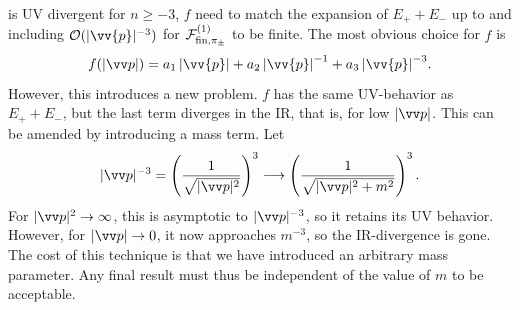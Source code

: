 %
is UV divergent for $n \geq -3$, $f$ need to match the expansion of $E_+ + E_-$ up to and including $\Oh(|\vv{p}|^{-3})$ for $\mathcal{F}^{(1)}_{\mathrm{fin}, \pi_\pm }$ to be finite.
The most obvious choice for $f$ is
%
\begin{equation}
    f(|\vv p|) 
    = a_1  \abs{\vv{p}} + a_2 \, {\abs{\vv{p}}}^{-1} + a_3 \, {\abs{\vv{p}}}^{-3}.
\end{equation}
%
However, this introduces a new problem.
$f$ has the same UV-behavior as $E_+ + E_-$, but the last term diverges in the IR, that is, for low $|\vv p|$.
This can be amended by introducing a mass term.
Let
%
\begin{equation}
    |\vv p|^{-3} 
    = 
    \left(\frac{1}{\sqrt{|\vv p|^2}}\right)^3 
    \longrightarrow 
    \left(\frac{1}{\sqrt{|\vv p|^2 + m^2}}\right)^3.
\end{equation}
%
For $|\vv p|^2 \rightarrow \infty$, this is asymptotic to $|\vv p|^{-3}$, so it retains its UV behavior.
However, for $|\vv p| \rightarrow 0$, it now approaches $m^{-3}$, so the IR-divergence is gone.
The cost of this technique is that we have introduced an arbitrary mass parameter.
Any final result must thus be independent of the value of $m$ to be acceptable.

